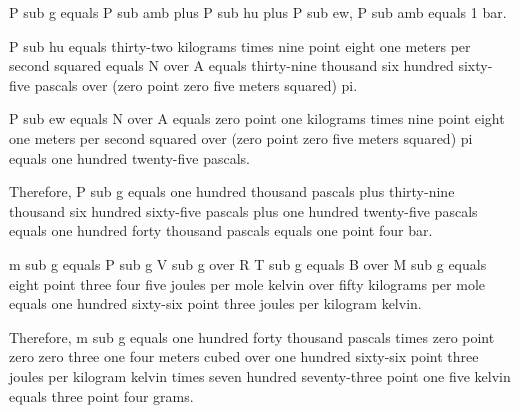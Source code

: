 P sub g equals P sub amb plus P sub hu plus P sub ew, P sub amb equals 1 bar.

P sub hu equals thirty-two kilograms times nine point eight one meters per second squared equals N over A equals thirty-nine thousand six hundred sixty-five pascals over (zero point zero five meters squared) pi.

P sub ew equals N over A equals zero point one kilograms times nine point eight one meters per second squared over (zero point zero five meters squared) pi equals one hundred twenty-five pascals.

Therefore, P sub g equals one hundred thousand pascals plus thirty-nine thousand six hundred sixty-five pascals plus one hundred twenty-five pascals equals one hundred forty thousand pascals equals one point four bar.

m sub g equals P sub g V sub g over R T sub g equals B over M sub g equals eight point three four five joules per mole kelvin over fifty kilograms per mole equals one hundred sixty-six point three joules per kilogram kelvin.

Therefore, m sub g equals one hundred forty thousand pascals times zero point zero zero three one four meters cubed over one hundred sixty-six point three joules per kilogram kelvin times seven hundred seventy-three point one five kelvin equals three point four grams.